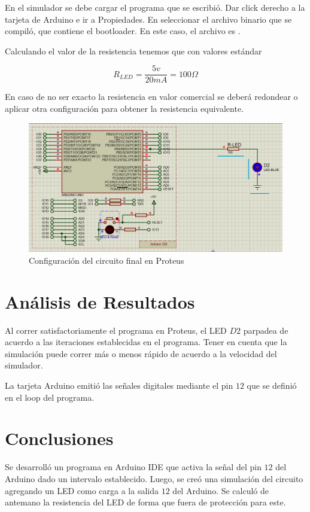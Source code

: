 \documentclass{article}
\begin{document}
    En el simulador se debe cargar el programa que se escribió. Dar click
    derecho a la tarjeta de Arduino e ir a
    Propiedades. En  seleccionar el archivo binario
    que se compiló, que contiene el bootloader.
    En este caso, el archivo es .

    \bigbreak

    Calculando el valor de la resistencia tenemos que con valores estándar

    $$
    R_{LED} = \frac{5v}{20mA} = 100\Omega
    $$

    En caso de no ser exacto la resistencia en valor comercial se deberá
    redondear o aplicar otra configuración para obtener la resistencia
    equivalente.

    \begin{figure}[H]
        \centering
        \includegraphics[width=0.5\paperwidth]{images/sim-2}
        \caption{Configuración del circuito final en Proteus}
    \end{figure}

    \section{Análisis de Resultados}

    Al correr satisfactoriamente el programa en Proteus, el LED $D2$ parpadea
    de acuerdo a las iteraciones establecidas en el programa. Tener en cuenta
    que la simulación puede correr más o menos rápido de acuerdo a la
    velocidad del simulador.

    \bigbreak

    La tarjeta Arduino emitió las señales digitales mediante el pin $12$ que
    se definió en el loop del programa.

    \section{Conclusiones}

    Se desarrolló un programa en Arduino IDE que activa la señal del pin $12$
    del Arduino dado un intervalo establecido. Luego, se creó una simulación
    del circuito agregando un LED como carga a la salida $12$ del Arduino. Se
    calculó de antemano la resistencia del LED de forma que fuera de
    protección para este.

    \printbibliography
\end{document}
